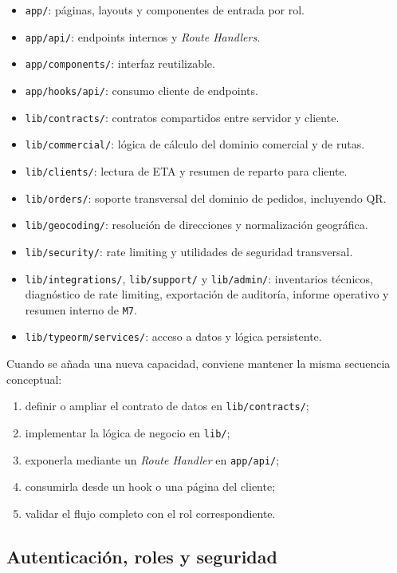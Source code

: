 \begin{itemize}
    \item \texttt{app/}: páginas, layouts y componentes de entrada por rol.
    \item \texttt{app/api/}: endpoints internos y \textit{Route Handlers}.
    \item \texttt{app/components/}: interfaz reutilizable.
    \item \texttt{app/hooks/api/}: consumo cliente de endpoints.
    \item \texttt{lib/contracts/}: contratos compartidos entre servidor y cliente.
    \item \texttt{lib/commercial/}: lógica de cálculo del dominio comercial y de rutas.
    \item \texttt{lib/clients/}: lectura de ETA y resumen de reparto para cliente.
    \item \texttt{lib/orders/}: soporte transversal del dominio de pedidos, incluyendo QR.
    \item \texttt{lib/geocoding/}: resolución de direcciones y normalización geográfica.
    \item \texttt{lib/security/}: rate limiting y utilidades de seguridad transversal.
    \item \texttt{lib/integrations/}, \texttt{lib/support/} y \texttt{lib/admin/}: inventarios técnicos, diagnóstico de rate limiting, exportación de auditoría, informe operativo y resumen interno de \texttt{M7}.
    \item \texttt{lib/typeorm/services/}: acceso a datos y lógica persistente.
\end{itemize}

Cuando se añada una nueva capacidad, conviene mantener la misma secuencia conceptual:

\begin{enumerate}
    \item definir o ampliar el contrato de datos en \texttt{lib/contracts/};
    \item implementar la lógica de negocio en \texttt{lib/};
    \item exponerla mediante un \textit{Route Handler} en \texttt{app/api/};
    \item consumirla desde un hook o una página del cliente;
    \item validar el flujo completo con el rol correspondiente.
\end{enumerate}

\subsection{Autenticación, roles y seguridad}

